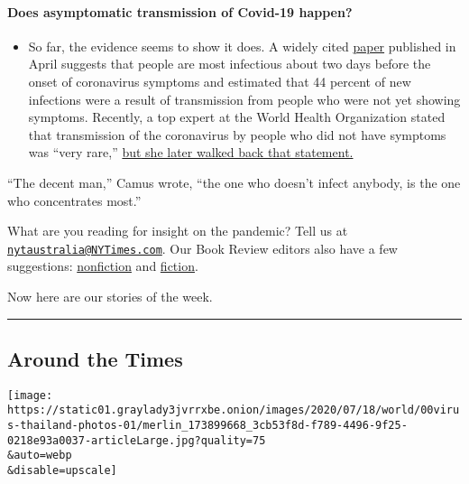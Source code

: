 \begin{itemize}
{  \paragraph{Does asymptomatic transmission of Covid-19
  happen?}\label{does-asymptomatic-transmission-of-covid-19-happen}}

  \begin{itemize}
  \tightlist
  \item
    So far, the evidence seems to show it does. A widely cited
    \href{https://www.nature.com/articles/s41591-020-0869-5}{paper}
    published in April suggests that people are most infectious about
    two days before the onset of coronavirus symptoms and estimated that
    44 percent of new infections were a result of transmission from
    people who were not yet showing symptoms. Recently, a top expert at
    the World Health Organization stated that transmission of the
    coronavirus by people who did not have symptoms was ``very rare,''
    \href{https://www.nytimes3xbfgragh.onion/2020/06/09/world/coronavirus-updates.html?action=click\&pgtype=Article\&state=default\&region=MAIN_CONTENT_3\&context=storylines_faq\#link-1f302e21}{but
    she later walked back that statement.}
  \end{itemize}
\end{itemize}

``The decent man,'' Camus wrote, ``the one who doesn't infect anybody,
is the one who concentrates most.''

What are you reading for insight on the pandemic? Tell us at
\href{mailto:nytaustralia@NYTimes.com}{\nolinkurl{nytaustralia@NYTimes.com}}.
Our Book Review editors also have a few suggestions:
\href{https://www.nytimes3xbfgragh.onion/2020/02/24/books/pandemic-books-coronavirus.html}{nonfiction}
and
\href{https://www.nytimes3xbfgragh.onion/2020/03/12/books/coronavirus-reading.html}{fiction}.

Now here are our stories of the week.

\begin{center}\rule{0.5\linewidth}{\linethickness}\end{center}

\hypertarget{around-the-times}{%
\subsection{Around the Times}\label{around-the-times}}

\texttt{[image: https://static01.graylady3jvrrxbe.onion/images/2020/07/18/world/00virus-thailand-photos-01/merlin\_173899668\_3cb53f8d-f789-4496-9f25-0218e93a0037-articleLarge.jpg?quality=75\\\&auto=webp\\\&disable=upscale]}

